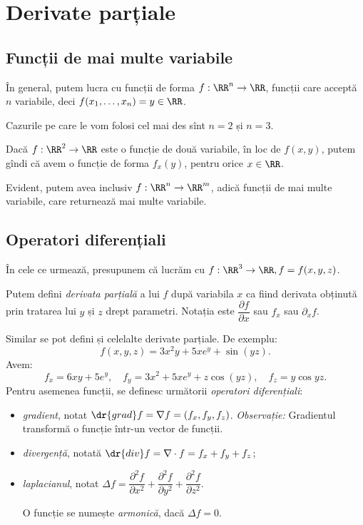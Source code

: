 \chapter{Derivate parțiale}

\section{Funcții de mai multe variabile}

În general, putem lucra cu funcții de forma $ f : \RR^n \to \RR $,
funcții care acceptă $ n $ variabile, deci $ f(x_1, \dots, x_n) = y \in \RR $.

Cazurile pe care le vom folosi cel mai des sînt $ n = 2 $ și $ n = 3 $.

Dacă $ f : \RR^2 \to \RR $ este o funcție de două variabile, în loc
de $ f(x, y) $, putem gîndi că avem o funcție de forma $ f_x(y) $, pentru
orice $ x \in \RR $.

Evident, putem avea inclusiv $ f : \RR^n \to \RR^m $, adică funcții de
mai multe variabile, care returnează mai multe variabile.


\section{Operatori diferențiali}

În cele ce urmează, presupunem că lucrăm cu $ f : \RR^3 \to \RR, f = f(x, y, z) $.

Putem defini \emph{derivata parțială} a lui $ f $ după variabila $ x $
ca fiind derivata obținută prin tratarea lui $ y $ și $ z $ drept parametri.
Notația este $ \dfrac{\partial f}{\partial x} $ sau $ f_x $ sau $ \partial_x f $.

Similar se pot defini și celelalte derivate parțiale. De exemplu:
\[
  f(x, y, z) = 3x^2 y + 5xe^y + \sin(yz).
\]
Avem:
\[
  f_x = 6xy + 5e^y, \quad f_y = 3x^2 + 5xe^y + z\cos(yz), \quad %
  f_z = y\cos yz.
\]
Pentru asemenea funcții, se definesc următorii \emph{operatori diferențiali}:
\begin{itemize}
\item \emph{gradient}, notat $ \dr{grad}f = \nabla f = (f_x, f_y, f_z) $.
  \emph{Observație:} Gradientul transformă o funcție într-un vector de funcții.
\item \emph{divergență}, notată $ \dr{div} f = \nabla \cdot f = f_x + f_y + f_z $;
\item \emph{laplacianul}, notat $ \Delta f = \dfrac{\partial^2 f}{\partial x^2} + %
  \dfrac{\partial^2 f}{\partial y^2} + \dfrac{\partial^2 f}{\partial z^2} $.

  O funcție se numește \emph{armonică}, dacă $ \Delta f = 0 $.
\end{itemize}

